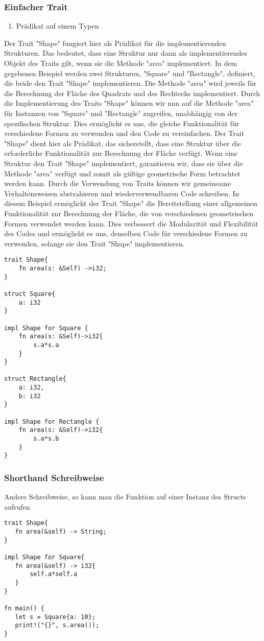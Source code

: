 \documentclass[a4paper, 1ppt]{article}
\begin{document}
\subsubsection{Einfacher Trait}
\begin{enumerate}
		\item Prädikat auf einem Typen
\end{enumerate}
Der Trait "Shape" fungiert hier als Prädikat für die implementierenden Strukturen. Das bedeutet, dass eine Struktur nur dann als implementierendes Objekt des Traits gilt, wenn sie die Methode "area" implementiert.
In dem gegebenen Beispiel werden zwei Strukturen, "Square" und "Rectangle", definiert, die beide den Trait "Shape" implementieren. Die Methode "area" wird jeweils für die Berechnung der Fläche des Quadrats und des Rechtecks implementiert.
Durch die Implementierung des Traits "Shape" können wir nun auf die Methode "area" für Instanzen von "Square" und "Rectangle" zugreifen, unabhängig von der spezifischen Struktur. Dies ermöglicht es uns, die gleiche Funktionalität für verschiedene Formen zu verwenden und den Code zu vereinfachen.
Der Trait "Shape" dient hier als Prädikat, das sicherstellt, dass eine Struktur über die erforderliche Funktionalität zur Berechnung der Fläche verfügt. Wenn eine Struktur den Trait "Shape" implementiert, garantieren wir, dass sie über die Methode "area" verfügt und somit als gültige geometrische Form betrachtet werden kann.
Durch die Verwendung von Traits können wir gemeinsame Verhaltensweisen abstrahieren und wiederverwendbaren Code schreiben. In diesem Beispiel ermöglicht der Trait "Shape" die Bereitstellung einer allgemeinen Funktionalität zur Berechnung der Fläche, die von verschiedenen geometrischen Formen verwendet werden kann. Dies verbessert die Modularität und Flexibilität des Codes und ermöglicht es uns, denselben Code für verschiedene Formen zu verwenden, solange sie den Trait "Shape" implementieren.
\begin{verbatim}
trait Shape{
    fn area(s: &Self) ->i32;
}

struct Square{
    a: i32
}

impl Shape for Square {
    fn area(s: &Self)->i32{
        s.a*s.a
    }
}

struct Rectangle{
    a: i32,
    b: i32
}

impl Shape for Rectangle {
    fn area(s: &Self)->i32{
        s.a*s.b
    }
}

\end{verbatim}
\subsubsection{Shorthand Schreibweise}
Andere Schreibweise, so kann man die Funktion auf einer Instanz des Structs aufrufen
\begin{verbatim}
trait Shape{
   fn area(&self) -> String;
}

impl Shape for Square{
   fn area(&self) -> i32{
       self.a*self.a
   }
}

fn main() {
   let s = Square{a: 10};
   print!("{}", s.area());
}
\end{verbatim}
\end{document}
